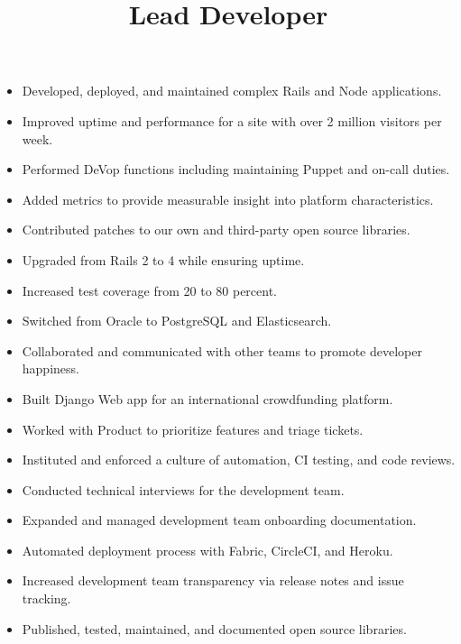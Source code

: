 \documentclass[line]{res}
\begin{document}
\begin{resume}
\begin{position}
\begin{itemize}
\item Developed, deployed, and maintained complex Rails and Node applications.
\item Improved uptime and performance for a site with over 2 million visitors per week.
\item Performed DeVop functions including maintaining Puppet and on-call duties.
\item Added metrics to provide measurable insight into platform characteristics.
\item Contributed patches to our own and third-party open source libraries.
\item Upgraded from Rails 2 to 4 while ensuring uptime.
\item Increased test coverage from 20 to 80 percent.
\item Switched from Oracle to PostgreSQL and Elasticsearch.
\item Collaborated and communicated with other teams to promote developer happiness.

\end{itemize}
\end{position}

\title{Lead Developer}
\begin{position}
\noindent
\vspace {-10 pt}
\begin{itemize}

\item Built Django Web app for an international crowdfunding platform.
\item Worked with Product to prioritize features and triage tickets.
\item Instituted and enforced a culture of automation, CI testing, and code reviews.
\item Conducted technical interviews for the development team.
\item Expanded and managed development team onboarding documentation.
\item Automated deployment process with Fabric, CircleCI, and Heroku.
\item Increased development team transparency via release notes and issue tracking.
\item Published, tested, maintained, and documented open source libraries.

\end{itemize}
\end{position}



\end{resume}
\end{document}
